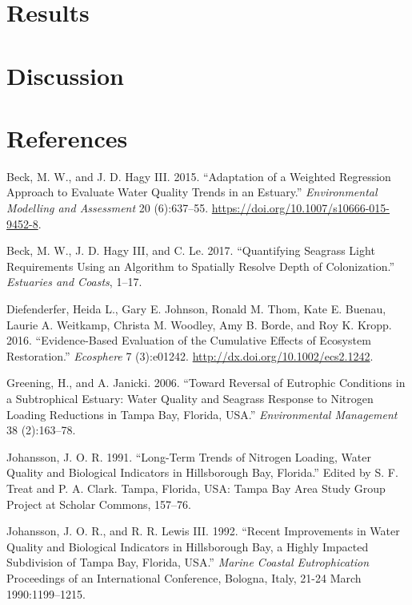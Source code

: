 \documentclass[]{article}
\begin{document}
\hypertarget{results}{%
\section{Results}\label{results}}

\hypertarget{discussion}{%
\section{Discussion}\label{discussion}}

\hypertarget{references}{%
\section*{References}\label{references}}

\hypertarget{refs}{}
\leavevmode\hypertarget{ref-Beck15}{}%
Beck, M. W., and J. D. Hagy III. 2015. ``Adaptation of a Weighted
Regression Approach to Evaluate Water Quality Trends in an Estuary.''
\emph{Environmental Modelling and Assessment} 20 (6):637--55.
\url{https://doi.org/10.1007/s10666-015-9452-8}.

\leavevmode\hypertarget{ref-Beck17c}{}%
Beck, M. W., J. D. Hagy III, and C. Le. 2017. ``Quantifying Seagrass
Light Requirements Using an Algorithm to Spatially Resolve Depth of
Colonization.'' \emph{Estuaries and Coasts}, 1--17.

\leavevmode\hypertarget{ref-Diefenderfer16}{}%
Diefenderfer, Heida L., Gary E. Johnson, Ronald M. Thom, Kate E. Buenau,
Laurie A. Weitkamp, Christa M. Woodley, Amy B. Borde, and Roy K. Kropp.
2016. ``Evidence-Based Evaluation of the Cumulative Effects of Ecosystem
Restoration.'' \emph{Ecosphere} 7 (3):e01242.
\url{http://dx.doi.org/10.1002/ecs2.1242}.

\leavevmode\hypertarget{ref-Greening06}{}%
Greening, H., and A. Janicki. 2006. ``Toward Reversal of Eutrophic
Conditions in a Subtrophical Estuary: Water Quality and Seagrass
Response to Nitrogen Loading Reductions in Tampa Bay, Florida, USA.''
\emph{Environmental Management} 38 (2):163--78.

\leavevmode\hypertarget{ref-Johansson91}{}%
Johansson, J. O. R. 1991. ``Long-Term Trends of Nitrogen Loading, Water
Quality and Biological Indicators in Hillsborough Bay, Florida.'' Edited
by S. F. Treat and P. A. Clark. Tampa, Florida, USA: Tampa Bay Area
Study Group Project at Scholar Commons, 157--76.

\leavevmode\hypertarget{ref-Johansson92}{}%
Johansson, J. O. R., and R. R. Lewis III. 1992. ``Recent Improvements in
Water Quality and Biological Indicators in Hillsborough Bay, a Highly
Impacted Subdivision of Tampa Bay, Florida, USA.'' \emph{Marine Coastal
Eutrophication} Proceedings of an International Conference, Bologna,
Italy, 21-24 March 1990:1199--1215.
\end{document}
